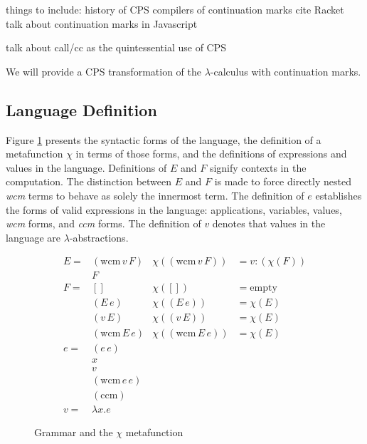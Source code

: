 \documentclass[ms]{byuprop}
\newcounter{definition}
\begin{document}
things to include:
history of CPS
compilers of continuation marks
cite Racket
talk about continuation marks in Javascript


talk about call/cc as the quintessential use of CPS



We will provide a CPS transformation of the $\lambda$-calculus with continuation marks.

\subsection{Language Definition}

Figure \ref{language-definition} presents the syntactic forms of the language, the 
definition of a metafunction $\chi$ in terms of those forms, and the definitions of 
expressions and values in the language. Definitions of $E$ and $F$ signify contexts in the 
computation. The distinction between $E$ and $F$ is made to force directly nested 
\emph{wcm} terms to behave as solely the innermost term. The definition of $e$ establishes 
the forms of valid expressions in the language: applications, variables, values, \emph{wcm} 
forms, and \emph{ccm} forms. The definition of $v$ denotes that values in the language 
are $\lambda$-abstractions.


\begin{figure}
\begin{align*}
E = &(\mathrm{wcm}\,v\,F) & \chi((\mathrm{wcm}\,v\,F)) &= v : (\chi(F))\\
    &F\\
F = &[]                   & \chi([])                   &= \mathrm{empty}\\
    &(E\,e)               & \chi((E\,e))               &= \chi(E)\\
    &(v\,E)               & \chi((v\,E))               &= \chi(E)\\
    &(\mathrm{wcm}\,E\,e) & \chi((\mathrm{wcm}\,E\,e)) &= \chi(E)\\
e = &(e\,e)\\
    &x\\
    &v\\
    &(\mathrm{wcm}\,e\,e)\\
    &(\mathrm{ccm})\\
v = & \lambda x. e
\end{align*}
\caption{Grammar and the $\chi$ metafunction}
\label{language-definition}
\end{figure}
\end{document}

